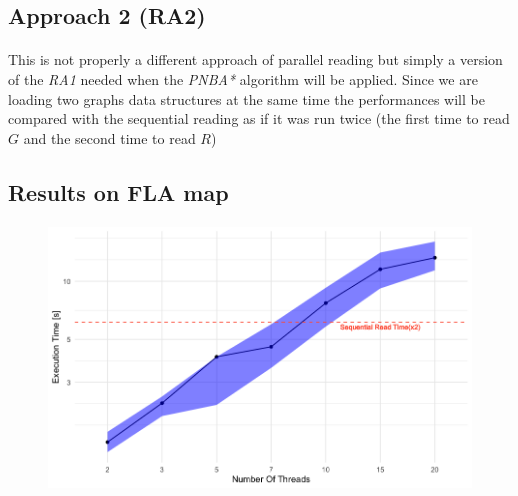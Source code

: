 \documentclass[12pt]{beamer}
\begin{document}
	\subsection{Approach 2 (RA2)}
	\begin{frame}{\secname}
		\framesubtitle{\subsecname}
		This is not properly a different approach of parallel reading but simply a version
		of the \textit{RA1} needed when the \textit{PNBA*} algorithm will be applied.
		Since we are loading two graphs data structures at the same time the performances will
		be compared with the sequential reading as if it was run twice (the first time to read $G$ and
		the second time to read $R$)
	\end{frame}
	\subsection{Results on FLA map}
	\begin{frame}{\secname}
		\framesubtitle{\subsecname}
		\begin{figure}[ht!]
			\centering
			\includegraphics[width=0.8\linewidth]{read/par_read_2_time.png}
			\label{parread2time}
		  \end{figure}
	\end{frame}
\end{document}
